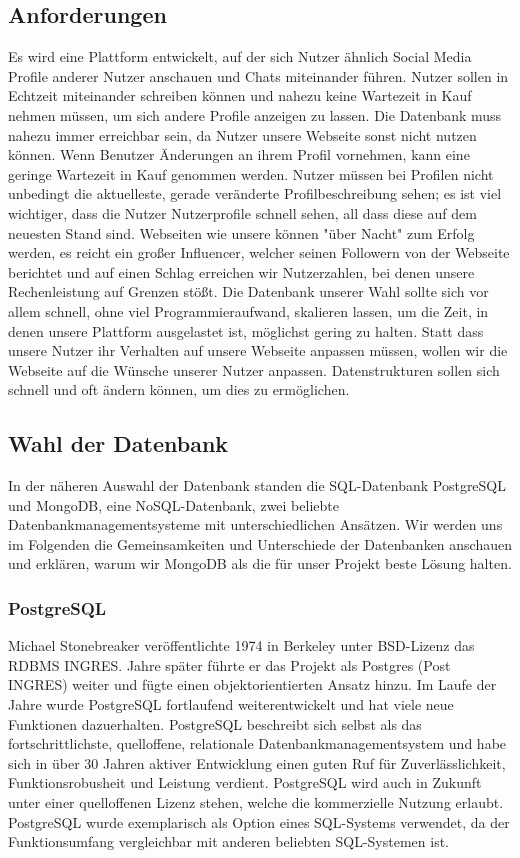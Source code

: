 \subsection{Anforderungen}
Es wird eine Plattform entwickelt, auf der sich Nutzer ähnlich Social Media Profile anderer Nutzer anschauen und Chats miteinander führen. Nutzer sollen in Echtzeit miteinander schreiben können und nahezu keine Wartezeit in Kauf nehmen müssen, um sich andere Profile anzeigen zu lassen. Die Datenbank muss nahezu immer erreichbar sein, da Nutzer unsere Webseite sonst nicht nutzen können. 
Wenn Benutzer Änderungen an ihrem Profil vornehmen, kann eine geringe Wartezeit in Kauf genommen werden. Nutzer müssen bei Profilen nicht unbedingt die aktuelleste, gerade veränderte Profilbeschreibung sehen; es ist viel wichtiger, dass die Nutzer Nutzerprofile schnell sehen, all dass diese auf dem neuesten Stand sind. 
Webseiten wie unsere können "über Nacht" zum Erfolg werden, es reicht ein großer Influencer, welcher seinen Followern von der Webseite berichtet und auf einen Schlag erreichen wir Nutzerzahlen, bei denen unsere Rechenleistung auf Grenzen stößt. Die Datenbank unserer Wahl sollte sich vor allem schnell, ohne viel Programmieraufwand, skalieren lassen, um die Zeit, in denen unsere Plattform ausgelastet ist, möglichst gering zu halten. 
Statt dass unsere Nutzer ihr Verhalten auf unsere Webseite anpassen müssen, wollen wir die Webseite auf die Wünsche unserer Nutzer anpassen. Datenstrukturen sollen sich schnell und oft ändern können, um dies zu ermöglichen.

\subsection{Wahl der Datenbank}
In der näheren Auswahl der Datenbank standen die SQL-Datenbank PostgreSQL und MongoDB, eine NoSQL-Datenbank, zwei beliebte Datenbankmanagementsysteme mit unterschiedlichen Ansätzen. Wir werden uns im Folgenden die Gemeinsamkeiten und Unterschiede der Datenbanken anschauen und erklären, warum wir MongoDB als die für unser Projekt beste Lösung halten.

\subsubsection{PostgreSQL}
Michael Stonebreaker veröffentlichte 1974 in Berkeley unter BSD-Lizenz das RDBMS INGRES. Jahre später führte er das Projekt als Postgres (Post INGRES) weiter und fügte einen objektorientierten Ansatz hinzu. \cite{PG1} Im Laufe der Jahre wurde PostgreSQL fortlaufend weiterentwickelt und hat viele neue Funktionen dazuerhalten.
PostgreSQL beschreibt sich selbst als das fortschrittlichste, quelloffene, relationale Datenbankmanagementsystem und habe sich in über 30 Jahren aktiver Entwicklung einen guten Ruf für Zuverlässlichkeit, Funktionsrobusheit und Leistung verdient. \cite{PG2} PostgreSQL wird auch in Zukunft unter einer quelloffenen Lizenz stehen, welche die kommerzielle Nutzung erlaubt. \cite{PG3}
PostgreSQL wurde exemplarisch als Option eines SQL-Systems verwendet, da der Funktionsumfang vergleichbar mit anderen beliebten SQL-Systemen ist. \cite{PG4}

